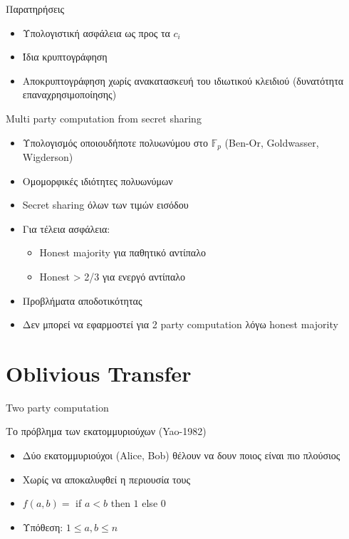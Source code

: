 \documentclass[handout]{beamer}
\begin{document}
\begin{frame}{Παρατηρήσεις}
\begin{itemize}
\item Υπολογιστική ασφάλεια ως προς τα $c_i$
\pause
\item Ίδια κρυπτογράφηση
\pause
\item Αποκρυπτογράφηση χωρίς ανακατασκευή του ιδιωτικού κλειδιού (δυνατότητα επαναχρησιμοποίησης)
\end{itemize}
\end{frame}

\begin{frame}{Multi party computation from secret sharing}
	\begin{itemize}
		\item Υπολογισμός οποιουδήποτε πολυωνύμου στο $\mathbb{F}_p$ (Ben-Or, Goldwasser, Wigderson)
		\item Ομομορφικές ιδιότητες πολυωνύμων
		\item Secret sharing όλων των τιμών εισόδου
		\item Για τέλεια ασφάλεια:
		\begin{itemize}
		\item Honest majority για παθητικό αντίπαλο
		\item Honest > 2/3 για ενεργό αντίπαλο 
		\end{itemize}
		\item Προβλήματα αποδοτικότητας
		\item Δεν μπορεί να εφαρμοστεί για 2 party computation λόγω honest majority
	\end{itemize}
\end{frame}

\section{Oblivious Transfer}
\begin{frame}{Two party computation}
	\begin{block}{Το πρόβλημα των εκατομμυριούχων (Yao-1982)}
	\begin{itemize}
		\item Δύο εκατομμυριούχοι (Alice, Bob) θέλουν να δουν ποιος είναι πιο πλούσιος
		\item Χωρίς να αποκαλυφθεί	η περιουσία τους
		\item $f(a,b) = $ if $a<b$ then $1$ else $0$
		\item Υπόθεση: $1 \leq a,b \leq n$
	\end{itemize}
	\end{block}
\end{frame}
\end{document}

